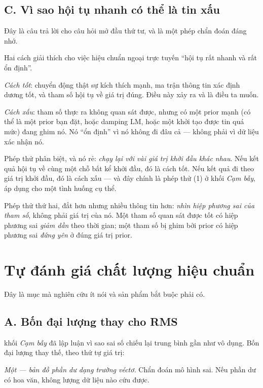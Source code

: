 \documentclass[../../vslam.tex]{subfiles}
\begin{document}
\subsection{C. Vì sao hội tụ nhanh có thể là tin xấu}

Đây là câu trả lời cho câu hỏi mở đầu thứ tư, và là một phép chẩn đoán đáng nhớ.

Hai cách giải thích cho việc hiệu chuẩn ngoại trực tuyến ``hội tụ rất nhanh và rất ổn định''.

\emph{Cách tốt}: chuyển động thật sự kích thích mạnh, ma trận thông tin xác định dương tốt, và tham số hội tụ về giá trị đúng. Điều này xảy ra và là điều ta muốn.

\emph{Cách xấu}: tham số thực ra không quan sát được, nhưng có một prior mạnh (có thể là một prior bạn đặt, hoặc damping LM, hoặc một khởi tạo được tin quá mức) đang ghim nó. Nó ``ổn định'' vì nó không đi đâu cả --- không phải vì dữ liệu xác nhận nó.

Phép thử phân biệt, và nó rẻ: \emph{chạy lại với vài giá trị khởi đầu khác nhau}. Nếu kết quả hội tụ về cùng một chỗ bất kể khởi đầu, đó là cách tốt. Nếu kết quả đi theo giá trị khởi đầu, đó là cách xấu --- và đây chính là phép thử (1) ở  khối \emph{Cạm bẫy}, áp dụng cho một tình huống cụ thể.

Phép thử thứ hai, đắt hơn nhưng nhiều thông tin hơn: \emph{nhìn hiệp phương sai của tham số}, không phải giá trị của nó. Một tham số quan sát được tốt có hiệp phương sai \emph{giảm dần} theo thời gian; một tham số bị ghim bởi prior có hiệp phương sai \emph{đứng yên} ở đúng giá trị prior.

\section{Tự đánh giá chất lượng hiệu chuẩn}

Đây là mục mà nghiên cứu ít nói và sản phẩm bắt buộc phải có.

\subsection{A. Bốn đại lượng thay cho RMS}

 khối \emph{Cạm bẫy} đã lập luận vì sao sai số chiếu lại trung bình gần như vô dụng. Bốn đại lượng thay thế, theo thứ tự giá trị:

\emph{Một --- bản đồ phần dư dạng trường véctơ.} Chẩn đoán mô hình sai. Nếu phần dư có hoa văn, không lượng dữ liệu nào cứu được.
\end{document}
